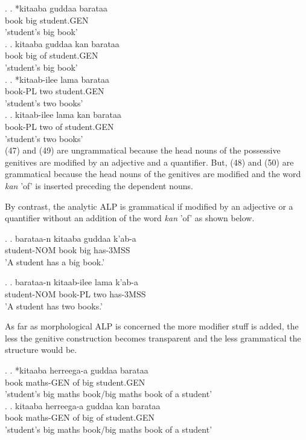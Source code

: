 \documentclass[11pt,a4paper]{article}
\begin{document}
	\ex.
	\ag.
	*kitaaba guddaa barataa\\
	book big student.GEN\\
	'student's big book'\\
	
	\ex.
	\ag.
	kitaaba guddaa kan barataa\\
	book big of student.GEN\\
	'student's big book'\\
	
	\ex.
	\ag.
	*kitaab-ilee lama barataa\\
	book-PL two student.GEN\\
	'student's two books'\\
	
	\ex.
	\ag.
	kitaab-ilee lama kan barataa\\
	book-PL two of student.GEN\\
	'student's two books'\\
	
	(47) and (49) are ungrammatical because the head nouns of the possessive genitives are modified by an adjective and a quantifier. But, (48) and (50) are grammatical because the head nouns of the genitives are modified and the word \emph{kan} 'of' is inserted preceding the dependent nouns. 
	
	By contrast, the analytic ALP is grammatical if modified by an adjective or a quantifier without an addition of the word \emph{kan} 'of' as shown below.
	
	\ex.
	\ag.
	barataa-n kitaaba guddaa k'ab-a\\
	student-NOM book big has-3MSS\\
	'A student has a big book.'
	
	\ex.
	\ag.
	barataa-n kitaab-ilee lama k'ab-a\\
	student-NOM book-PL two has-3MSS\\
	'A student has two books.'
	
	As far as morphological ALP is concerned the more modifier stuff is added, the less the genitive construction becomes transparent and the less grammatical the structure would be. 
	
	\ex.
	\ag.
	*kitaaba herreega-a guddaa barataa\\
	book maths-GEN of big student.GEN\\
	'student's big maths book/big maths book of a student'\\
	
	\ex.
	\ag.
	kitaaba herreega-a guddaa kan barataa\\
	book maths-GEN of big of student.GEN\\
	'student's big maths book/big maths book of a student'\\
	
\end{document}

